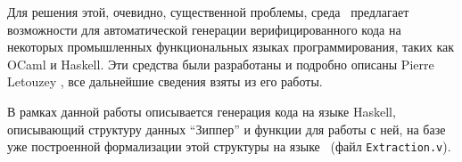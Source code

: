 Для решения этой, очевидно, существенной проблемы, среда \tcoq~предлагает возможности для автоматической генерации верифицированного кода на некоторых промышленных функциональных языках программирования, таких как OCaml и Haskell. Эти средства были разработаны и подробно описаны Pierre Letouzey \autocite{Pierre2004}, все дальнейшие сведения взяты из его работы.

В рамках данной работы описывается генерация кода на языке Haskell, описывающий структуру данных ``Зиппер'' и функции для работы с ней, на базе уже построенной формализации этой структуры на языке \tcoq~(файл \texttt{Extraction.v}).

\newpage

\Conc

\newpage

\printbibliography[%
    heading=bibintoc%
]

\appendix
{}

